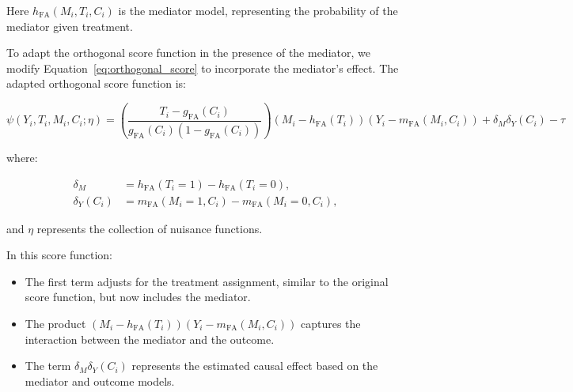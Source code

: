 \documentclass{article}
\numberwithin{equation}{section}
\newenvironment{colorparagraph}[1]{\par\color{#1}}{\par}
\begin{document}
{\begin{colorparagraph}{annotationcolor}
Here $h_{\text{FA}}(M_i, T_i, C_i)$ is the mediator model, representing the probability of the mediator given treatment.

To adapt the orthogonal score function in the presence of the mediator, we modify Equation~\eqref{eq:orthogonal_score} to incorporate the mediator's effect. The adapted orthogonal score function is:

\begin{equation}
\psi(Y_i, T_i, M_i, C_i; \eta) = \left( \frac{T_i - g_{\text{FA}}(C_i)}{g_{\text{FA}}(C_i)(1 - g_{\text{FA}}(C_i))} \right) \left( M_i - h_{\text{FA}}(T_i) \right) \left( Y_i - m_{\text{FA}}(M_i, C_i) \right) + \delta_M \delta_Y(C_i) - \tau
\label{eq:orthogonal_score_frontdoor_adjusted}
\end{equation}

where:

\begin{align}
    \delta_M & = h_{\text{FA}}(T_i = 1) - h_{\text{FA}}(T_i = 0),
    \label{eq:delta_M_Ci} \\
    \delta_Y(C_i) & = m_{\text{FA}}(M_i = 1, C_i) - m_{\text{FA}}(M_i = 0, C_i),
    \label{eq:delta_Y_Ci}
\end{align}

and $\eta$ represents the collection of nuisance functions.

In this score function:

\begin{itemize}
    \item The first term adjusts for the treatment assignment, similar to the original score function, but now includes the mediator.
    \item The product $\left( M_i - h_{\text{FA}}(T_i) \right) \left( Y_i - m_{\text{FA}}(M_i, C_i) \right)$ captures the interaction between the mediator and the outcome.
    \item The term $\delta_M \delta_Y(C_i)$ represents the estimated causal effect based on the mediator and outcome models.
\end{itemize}

\begin{figure}[H]
    \centering
\end{figure}
\end{colorparagraph}}
\end{document}
